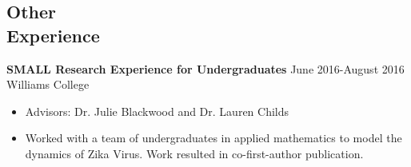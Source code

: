 \documentclass[margin, 10pt]{res}
\begin{document}
\begin{resume}
\section{Other \\
Experience}
{\textbf{SMALL Research Experience for Undergraduates} } \hfill June 2016-August 2016 \\
Williams College
\begin{itemize}
\item Advisors: Dr. Julie Blackwood and Dr. Lauren Childs
\item Worked with a team of undergraduates in applied mathematics to model the dynamics of Zika Virus. Work resulted in co-first-author publication. 
\end{itemize}
\end{resume}
\end{document}
